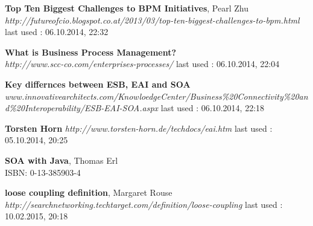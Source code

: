 \documentclass[12pt]{article}
\begin{document}
\begin{thebibliography}{56}
   \textbf{Top Ten Biggest Challenges to BPM Initiatives}, Pearl Zhu\\
  \emph{http://futureofcio.blogspot.co.at/2013/03/top-ten-biggest-challenges-to-bpm.html}
  \newline last used : 06.10.2014, 22:32
  
   \textbf{What is Business Process Management? }\\
  \emph{http://www.scc-co.com/enterprises-processes/}
  \newline last used : 06.10.2014, 22:04


   \textbf{Key differnces between ESB, EAI and SOA}\\
  \emph{www.innovativearchitects.com/KnowloedgeCenter/Business\%20Connectivity\%20and\%20Interoperability/ESB-EAI-SOA.aspx}
  \newline last used : 06.10.2014, 22:18


   \textbf{Torsten Horn}\newline
  \emph{http://www.torsten-horn.de/techdocs/eai.htm}
  \newline last used : 05.10.2014, 20:25


   \textbf{SOA with Java}, Thomas Erl \\
 	 ISBN: 0-13-385903-4
 	 
 	 
   \textbf{loose coupling definition}, Margaret Rouse\\
  \emph{ 	 http://searchnetworking.techtarget.com/definition/loose-coupling}
  \newline last used : 10.02.2015, 20:18
   	 
 	 
\end{thebibliography}
\end{document}
